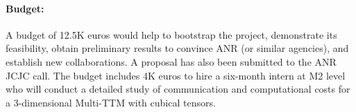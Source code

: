 \documentclass[a4paper,11pt]{article}
\begin{document}
   	\vspace*{-0.325cm}\paragraph{Budget:} A budget of 12.5K euros would help to bootstrap the project, demonstrate its feasibility, obtain preliminary results to convince ANR (or similar agencies), and establish new collaborations. A proposal has also been submitted to the ANR JCJC call. The budget includes 4K euros to hire a six-month intern at M2 level who will conduct a detailed study of communication and computational costs for a 3-dimensional Multi-TTM with cubical tensors.
   	

   	
   	
   	
   	
   	
\end{document}
